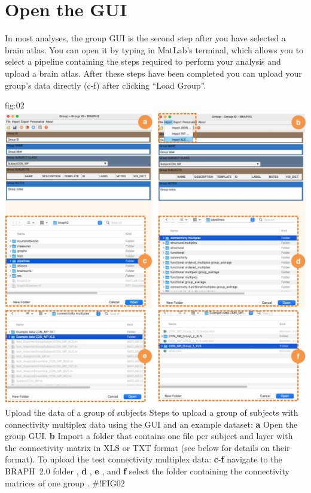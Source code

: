 \documentclass[justified]{tufte-handout}
\begin{document}
\section{Open the GUI}

In most analyses, the group GUI is the second step after you have selected a brain atlas. You can open it by typing  in MatLab's terminal, which allows you to select a pipeline containing the steps required to perform your analysis and upload a brain atlas. After these steps have been completed you can upload your group's data directly (c-f) after clicking ``Load Group''.

	{fig:02}
	{
	\includegraphics{fig02.jpg}
	}
	{Upload the data of a group of subjects}
	{
	Steps to upload a group of subjects with connectivity multiplex data using the GUI and an example dataset: 
	{\bf a} Open the group GUI.
	{\bf b} Import a folder that contains one file per subject and layer with the connectivity matrix in XLS or TXT format (see below for details on their format).
	To upload the test connectivity multiplex data:
	{\bf c}-{\bf f} navigate to the BRAPH~2.0 folder , {\bf d} ,  {\bf e} , and {\bf f} select the folder containing the connectivity matrices of one group .
	}
#!FIG02
\end{document}

